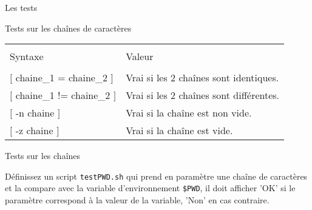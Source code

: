 \begin{frame}{Les tests}
  \begin{block}{Tests sur les chaînes de caractères}
    \begin{center}
      \begin{tabular}{ll}
        \hline\\
        Syntaxe&Valeur\\
        \hline\\
        $[$ chaine\_1 = chaine\_2 $]$&Vrai si les 2 chaînes sont identiques.\\[2pt]
        $[$ chaine\_1 != chaine\_2 $]$&Vrai si les 2 chaînes sont différentes.\\[2pt]
        $[$ -n chaine $]$&Vrai si la chaîne est non vide.\\[2pt]
        $[$ -z chaine $]$&Vrai si la chaîne est vide.\\[2pt]
        \hline
      \end{tabular}
    \end{center}
  \end{block}
  
  \begin{exercicelet}{Tests sur les chaînes}
    \begin{questions}
    \item Définissez un script \texttt{testPWD.sh} qui prend en paramètre une chaîne de caractères et la compare avec la variable d'environnement \texttt{\$PWD}, il doit afficher 'OK' si le paramètre correspond à la valeur de la variable, 'Non' en cas contraire.
    \end{questions}
  \end{exercicelet}
  
\end{frame}

